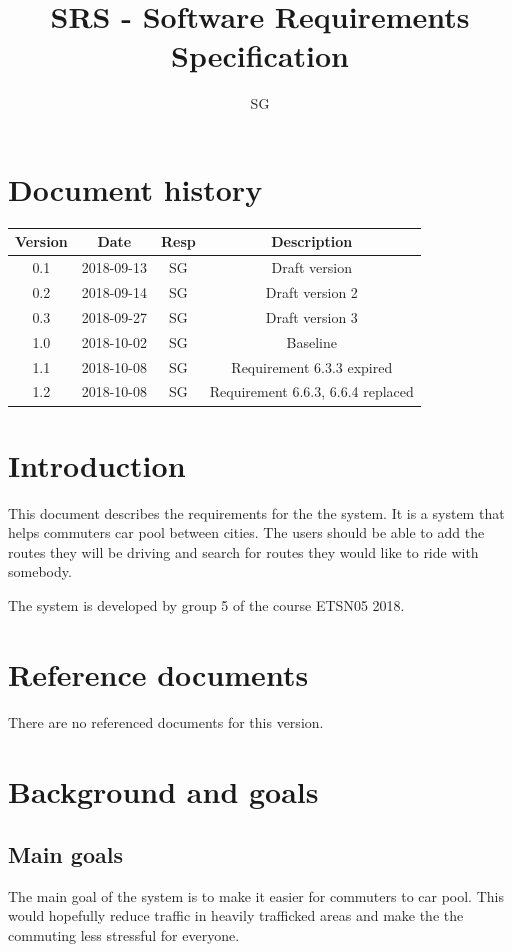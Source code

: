 \documentclass{article}
\title{SRS - Software Requirements Specification}
\begin{document}
\author{SG}

\maketitle
\thispagestyle{fancy}
\tableofcontents
\newpage

\section*{Document history}
 \begin{tabular}{||c c c c||} 
 \hline
 Version & Date & Resp & Description \\ [0.5ex] 
 \hline\hline
 0.1 & 2018-09-13 & SG & Draft version \\ 
 0.2 & 2018-09-14 & SG & Draft version 2 \\
 0.3 & 2018-09-27 & SG & Draft version 3 \\
 1.0 & 2018-10-02 & SG & Baseline \\
 1.1 & 2018-10-08 & SG & Requirement 6.3.3 expired \\
 1.2 & 2018-10-08 & SG & Requirement 6.6.3, 6.6.4 replaced \\
 \hline
 

\end{tabular}

\section{Introduction}
This document describes the requirements for the the system. It is a system that helps commuters car pool between cities. The users should be able to add the routes they will be driving and search for routes they would like to ride with somebody.

The system is developed by group 5 of the course ETSN05 2018.

\section{Reference documents}
There are no referenced documents for this version.
\section{Background and goals}

\subsection{Main goals}
The main goal of the system is to make it easier for commuters to car pool. This would hopefully reduce traffic in heavily trafficked areas and make the the commuting less stressful for everyone.  
\end{document}
